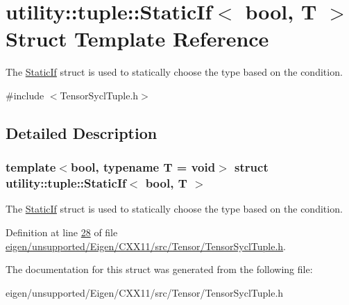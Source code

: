 \hypertarget{structutility_1_1tuple_1_1_static_if}{}\section{utility\+:\+:tuple\+:\+:Static\+If$<$ bool, T $>$ Struct Template Reference}
\label{structutility_1_1tuple_1_1_static_if}


The \hyperlink{structutility_1_1tuple_1_1_static_if}{Static\+If} struct is used to statically choose the type based on the condition.  




{\ttfamily \#include $<$Tensor\+Sycl\+Tuple.\+h$>$}



\subsection{Detailed Description}
\subsubsection*{template$<$bool, typename T = void$>$\newline
struct utility\+::tuple\+::\+Static\+If$<$ bool, T $>$}

The \hyperlink{structutility_1_1tuple_1_1_static_if}{Static\+If} struct is used to statically choose the type based on the condition. 

Definition at line \hyperlink{eigen_2unsupported_2_eigen_2_c_x_x11_2src_2_tensor_2_tensor_sycl_tuple_8h_source_l00028}{28} of file \hyperlink{eigen_2unsupported_2_eigen_2_c_x_x11_2src_2_tensor_2_tensor_sycl_tuple_8h_source}{eigen/unsupported/\+Eigen/\+C\+X\+X11/src/\+Tensor/\+Tensor\+Sycl\+Tuple.\+h}.



The documentation for this struct was generated from the following file\+:\begin{DoxyCompactItemize}
\item 
eigen/unsupported/\+Eigen/\+C\+X\+X11/src/\+Tensor/\+Tensor\+Sycl\+Tuple.\+h\end{DoxyCompactItemize}
